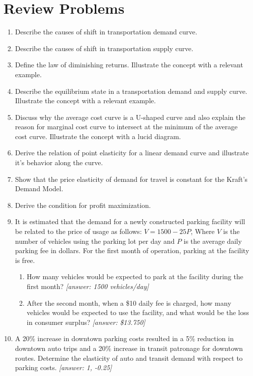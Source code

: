 \section{Review Problems}
\begin{enumerate}
	\item Describe the causes of shift in transportation demand curve.
	\item Describe the causes of shift in transportation supply curve.
	\item Define the law of diminishing returns. Illustrate the concept with a relevant example.
	\item Describe the equilibrium state in a transportation demand and supply curve. Illustrate the concept with a relevant example.
	\item Discuss why the average cost curve is a U-shaped curve and also explain the reason for marginal cost curve to intersect at the minimum of the average cost curve. Illustrate the concept with a lucid diagram.
	\item Derive the relation of point elasticity for a linear demand curve and illustrate it's behavior along the curve.
	\item Show that the price elasticity of demand for travel is constant for the Kraft's Demand Model.
	\item Derive the condition for profit maximization.
	\item It is estimated that the demand for a newly constructed parking facility will be related to the price of usage as follows: $ V = 1500 - 25 P $, Where $ V $ is the number of vehicles using the parking lot per day and $ P $ is the average daily parking fee in dollars. For the first month of operation, parking at the facility is free.
		\begin{enumerate}
			\item How many vehicles would be expected to park at the facility during the first month? \textit{[answer: 1500 vehicles/day]}
			\item After the second month, when a \$10 daily fee is charged, how many vehicles would be expected to use the facility, and what would be the loss in consumer surplus? \textit{[answer: \$13.750]}
		\end{enumerate}
	\item A 20\% increase in downtown parking costs resulted in a 5\% reduction in downtown auto trips and a 20\% increase in transit patronage for downtown routes. Determine the elasticity of auto and transit demand with respect to parking costs. \textit{[answer: 1, -0.25]}

\end{enumerate}
